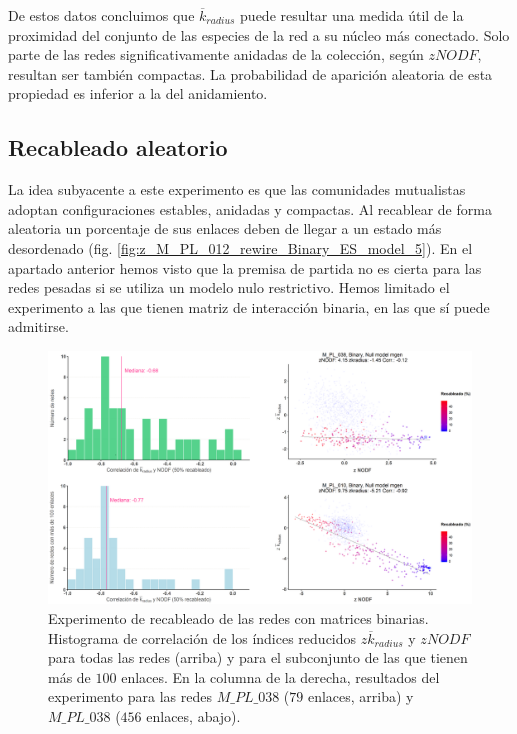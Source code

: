 De estos datos concluimos que $\overline k_{radius}$ puede resultar una medida útil de la proximidad del conjunto de las especies de la red a su núcleo más conectado. Solo parte de las redes significativamente anidadas de la colección, según $zNODF$, resultan ser también compactas. La probabilidad de aparición aleatoria de esta propiedad es inferior a la del anidamiento.


\subsection{Recableado aleatorio}

La idea subyacente a este experimento es que las comunidades mutualistas adoptan configuraciones estables, anidadas y compactas. Al recablear de forma aleatoria un porcentaje de sus enlaces deben de llegar a un estado más desordenado (fig. \ref{fig:z_M_PL_012_rewire_Binary_ES_model_5}). En el apartado anterior hemos visto que la premisa de partida no es cierta para las redes pesadas si se utiliza un modelo nulo restrictivo. Hemos limitado el experimento a las que tienen matriz de interacción binaria, en las que sí puede admitirse.

\begin{figure}[h!]
\centering
\includegraphics[scale=0.35]{Figures/ESTATICA_histo_corr_rewiring_ES.eps}
\caption {Experimento de recableado de las redes con matrices binarias. Histograma de correlación de los índices reducidos $z \overline {k}_{radius}$ y $zNODF$ para todas las redes (arriba) y para el subconjunto de las que tienen más de $100$ enlaces. En la columna de la derecha, resultados del experimento para las redes  $M\_PL\_038$ ($79$ enlaces, arriba) y $M\_PL\_038$ ($456$ enlaces, abajo).}
\label{fig:ESTATICA_histo_corr_rewiring}
\end{figure}

